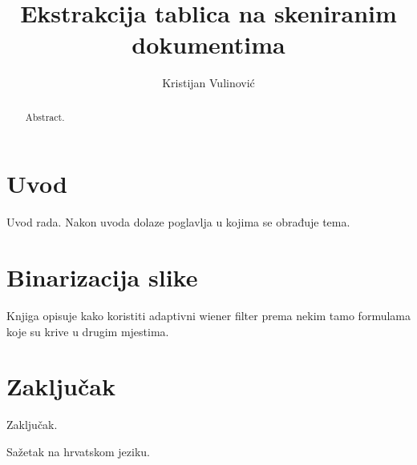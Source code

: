 \documentclass[times, utf8, zavrsni, numeric]{fer}
\begin{document}
\title{Ekstrakcija tablica na skeniranim dokumentima}
\author{Kristijan Vulinović}

\maketitle

\izvornik


\tableofcontents

\chapter{Uvod}
Uvod rada. Nakon uvoda dolaze poglavlja u kojima se obrađuje tema.

\chapter{Binarizacija slike}
Knjiga \cite{book:Two-Dimensional-Signal-Image-Processing} opisuje kako koristiti adaptivni wiener filter prema nekim tamo formulama koje su krive u drugim mjestima. 

\chapter{Zaključak}
Zaključak.





\begin{sazetak}
Sažetak na hrvatskom jeziku.

\end{sazetak}

\begin{abstract}
Abstract.

\end{abstract}
\end{document}
